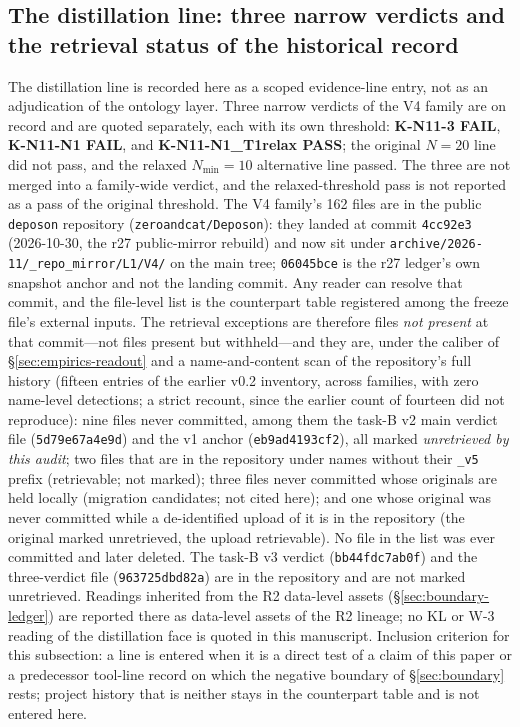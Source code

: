 \documentclass[11pt,a4paper]{article}
\begin{document}
\subsection{The distillation line: three narrow verdicts and the retrieval status of the historical record}
\label{sec:empirics-distillation}

The distillation line is recorded here as a scoped evidence-line entry, not as an adjudication of the ontology layer. Three narrow verdicts of the V4 family are on record and are quoted separately, each with its own threshold: \textbf{K-N11-3 FAIL}, \textbf{K-N11-N1 FAIL}, and \textbf{K-N11-N1\_T1relax PASS}; the original $N=20$ line did not pass, and the relaxed $N_{\min}=10$ alternative line passed. The three are not merged into a family-wide verdict, and the relaxed-threshold pass is not reported as a pass of the original threshold. The V4 family's 162 files are in the public \texttt{deposon} repository (\texttt{zeroandcat/Deposon}): they landed at commit \texttt{4cc92e3} (2026-10-30, the r27 public-mirror rebuild) and now sit under \texttt{archive/}\allowbreak\texttt{2026-11/}\allowbreak\texttt{\_repo\_mirror/}\allowbreak\texttt{L1/V4/} on the main tree; \texttt{06045bce} is the r27 ledger's own snapshot anchor and not the landing commit. Any reader can resolve that commit, and the file-level list is the counterpart table registered among the freeze file's external inputs. The retrieval exceptions are therefore files \emph{not present} at that commit---not files present but withheld---and they are, under the caliber of \S\ref{sec:empirics-readout} and a name-and-content scan of the repository's full history (fifteen entries of the earlier v0.2 inventory, across families, with zero name-level detections; a strict recount, since the earlier count of fourteen did not reproduce): nine files never committed, among them the task-B v2 main verdict file (\texttt{5d79e67a4e9d}) and the v1 anchor (\texttt{eb9ad4193cf2}), all marked \emph{unretrieved by this audit}; two files that are in the repository under names without their \texttt{\_v5} prefix (retrievable; not marked); three files never committed whose originals are held locally (migration candidates; not cited here); and one whose original was never committed while a de-identified upload of it is in the repository (the original marked unretrieved, the upload retrievable). No file in the list was ever committed and later deleted. The task-B v3 verdict (\texttt{bb44fdc7ab0f}) and the three-verdict file (\texttt{963725dbd82a}) are in the repository and are not marked unretrieved. Readings inherited from the R2 data-level assets (\S\ref{sec:boundary-ledger}) are reported there as data-level assets of the R2 lineage; no KL or W-3 reading of the distillation face is quoted in this manuscript. Inclusion criterion for this subsection: a line is entered when it is a direct test of a claim of this paper or a predecessor tool-line record on which the negative boundary of \S\ref{sec:boundary} rests; project history that is neither stays in the counterpart table and is not entered here.
\end{document}
